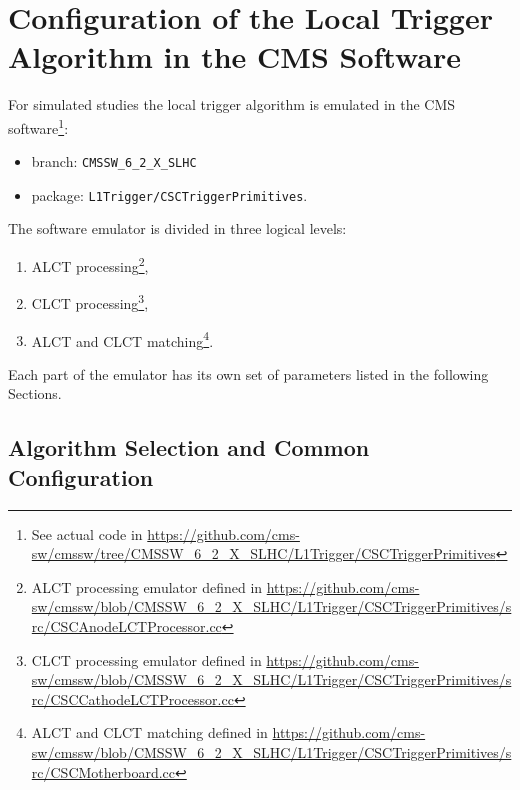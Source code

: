 \section{Configuration of the Local Trigger Algorithm in the CMS Software}

For simulated studies the local trigger algorithm is emulated in the CMS software\footnote{See actual code in \url{https://github.com/cms-sw/cmssw/tree/CMSSW\_6\_2\_X\_SLHC/L1Trigger/CSCTriggerPrimitives}}:
\begin{itemize}
\item branch: \verb|CMSSW_6_2_X_SLHC|
\item package: \verb|L1Trigger/CSCTriggerPrimitives|.
\end{itemize}
The software emulator is divided in three logical levels:
\begin{enumerate}
\item ALCT processing\footnote{ALCT processing emulator defined in \url{https://github.com/cms-sw/cmssw/blob/CMSSW\_6\_2\_X\_SLHC/L1Trigger/CSCTriggerPrimitives/src/CSCAnodeLCTProcessor.cc}},
\item CLCT processing\footnote{CLCT processing emulator defined in \url{https://github.com/cms-sw/cmssw/blob/CMSSW\_6\_2\_X\_SLHC/L1Trigger/CSCTriggerPrimitives/src/CSCCathodeLCTProcessor.cc}},
\item ALCT and CLCT matching\footnote{ALCT and CLCT matching defined in \url{https://github.com/cms-sw/cmssw/blob/CMSSW\_6\_2\_X\_SLHC/L1Trigger/CSCTriggerPrimitives/src/CSCMotherboard.cc}}.
\end{enumerate}
Each part of the emulator has its own set of parameters listed in the following Sections.

\subsection{Algorithm Selection and Common Configuration}
\label{subsec:algo_selection}


